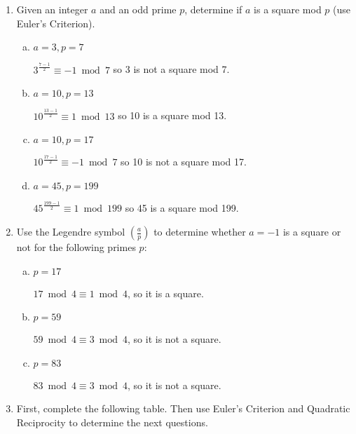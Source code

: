 \documentclass[12pt]{amsart}
\theoremstyle{plain}
\theoremstyle{definition}
\theoremstyle{remark}
\begin{document}
\begin{enumerate}[1.]
		\item Given an integer $a$ and an odd prime $p$, determine if $a$ is a square mod $p$ (use Euler's Criterion).
		\begin{enumerate}[a.]
			\item $a = 3, p = 7$
				\begin{framed}
				$3^{\frac{7-1}{2}} \equiv -1 \bmod 7$ so 3 is not a square mod 7.
				\end{framed}
			\item $a = 10, p = 13$
				\begin{framed}
				$10^{\frac{13-1}{2}} \equiv 1 \bmod 13$ so 10 is  a square mod 13.
				\end{framed}
			\item $a = 10, p = 17$
				\begin{framed}
				$10^{\frac{17-1}{2}} \equiv -1 \bmod 7$ so 10 is not a square mod 17.
				\end{framed}
			\item $a = 45, p = 199$
				\begin{framed}
				$45^{\frac{199-1}{2}} \equiv 1 \bmod 199$ so 45 is  a square mod 199.
				\end{framed}
		\end{enumerate}
		\item Use the Legendre symbol $\left( \frac{a}{p}\right)$ to determine whether $a = -1$ is a square or not for the following primes $p$:
		\begin{enumerate}[a.]
			\item $p = 17$
				\begin{framed}
				$17 \bmod 4 \equiv 1 \bmod 4$, so it is a square.
				\end{framed}
			\newpage \item $p =  59$
				\begin{framed}
				$59 \bmod 4 \equiv 3 \bmod 4$, so it is not a square.
				\end{framed}
			\item $p = 83$
				\begin{framed}
				$83 \bmod 4 \equiv 3 \bmod 4$, so it is not a square.
				\end{framed}
		\end{enumerate}
		\item First, complete the following table.  Then use Euler's Criterion and Quadratic Reciprocity to determine the next questions.
			\begin{center}
			\begin{tabular}{|p{1in}|p{3in}|} \hline

\end{tabular}
\end{center}
\end{enumerate}
\end{document}
